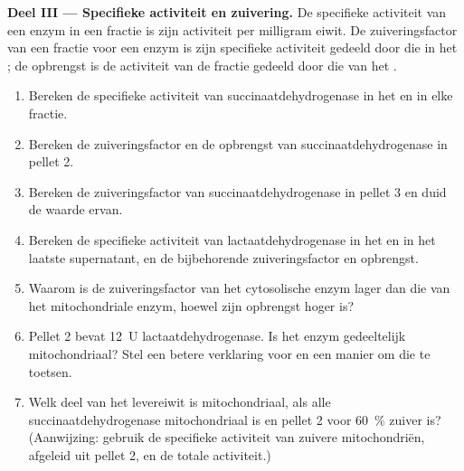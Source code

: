\begin{problem}
\medskip
\noindent\textbf{Deel III --- Specifieke activiteit en zuivering.}
De specifieke activiteit van een enzym in een fractie is zijn activiteit per
milligram eiwit. De zuiveringsfactor van een fractie voor een enzym is zijn
specifieke activiteit gedeeld door die in het ; de opbrengst is de
activiteit van de fractie gedeeld door die van het .
\begin{enumerate}[resume]
  \item Bereken de specifieke activiteit van succinaatdehydrogenase in het
         en in elke fractie.
  \item Bereken de zuiveringsfactor en de opbrengst van
        succinaatdehydrogenase in pellet 2.
  \item Bereken de zuiveringsfactor van succinaatdehydrogenase in
        pellet 3 en duid de waarde ervan.
  \item Bereken de specifieke activiteit van lactaatdehydrogenase in het
         en in het laatste supernatant, en de bijbehorende
        zuiveringsfactor en opbrengst.
  \item Waarom is de zuiveringsfactor van het cytosolische enzym lager dan
        die van het mitochondriale enzym, hoewel zijn opbrengst hoger is?
  \item Pellet 2 bevat \qty{12}{U} lactaatdehydrogenase. Is het enzym
        gedeeltelijk mitochondriaal? Stel een betere verklaring voor en
        een manier om die te toetsen.
  \item Welk deel van het levereiwit is mitochondriaal, als alle
        succinaatdehydrogenase mitochondriaal is en pellet 2 voor
        \qty{60}{\%} zuiver is? (Aanwijzing: gebruik de specifieke
        activiteit van zuivere mitochondriën, afgeleid uit pellet 2, en
        de totale activiteit.)
\end{enumerate}


\end{problem}
